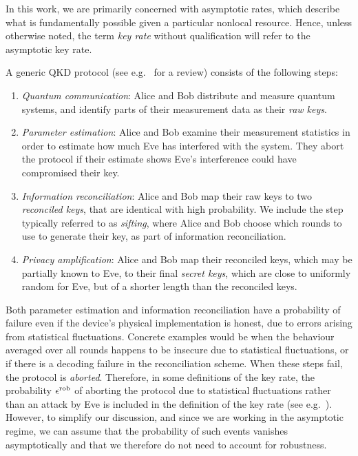 \documentclass[10pt, a4paper]{article}
\numberwithin{equation}{section} %
\theoremstyle{definition}
\theoremstyle{plain}
\newcommand{\?}{\mathrel{?}} %
\newcommand{\rob}{\rm rob}
\newcommand{\erob}[1][]{\epsilon^{\rob}_{#1}}
\begin{document}
    In this work, we are primarily concerned with asymptotic rates, which describe what is fundamentally possible given a particular nonlocal resource. Hence, unless otherwise noted, the term \emph{key rate} without qualification will refer to the asymptotic key rate.

    A generic QKD protocol (see e.g.~\cite{PracticalQKD} for a review) consists of the following steps:
    \begin{enumerate}
      \item \emph{Quantum communication}: Alice and Bob distribute and measure quantum systems, and identify parts of their measurement data as their \emph{raw keys}.
      \item \emph{Parameter estimation}: Alice and Bob examine their measurement statistics in order to estimate how much Eve has interfered with the system. They abort the protocol if their estimate shows Eve's interference could have compromised their key.
      \item \emph{Information reconciliation}: Alice and Bob map their raw keys to two \emph{reconciled keys}, that are identical with high probability. We include the step typically referred to as \emph{sifting}, where Alice and Bob choose which rounds to use to generate their key, as part of information reconciliation.
      \item \emph{Privacy amplification}: Alice and Bob map their reconciled keys, which may be partially known to Eve, to their final \emph{secret keys}, which are close to uniformly random for Eve, but of a shorter length than the reconciled keys.
    \end{enumerate}
    Both parameter estimation and information reconciliation have a probability of failure even if the device's physical implementation is honest, due to errors arising from statistical fluctuations. Concrete examples would be when the behaviour averaged over all rounds happens to be insecure due to statistical fluctuations, or if there is a decoding failure in the reconciliation scheme. When these steps fail, the protocol is \emph{aborted}. Therefore, in some definitions of the key rate, the probability \(\erob\) of aborting the protocol due to statistical fluctuations rather than an attack by Eve is included in the definition of the key rate (see e.g.~\cite{SecurityQKD, CompleteSecurityProof}). However, to simplify our discussion, and since we are working in the asymptotic regime, we can assume that the probability of such events vanishes asymptotically and that we therefore do not need to account for robustness.
\end{document}
